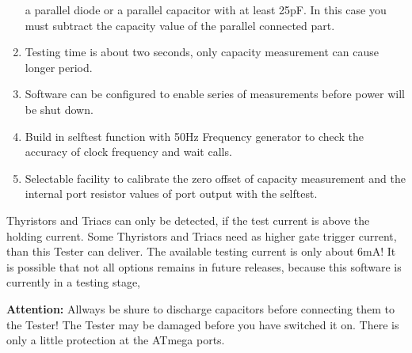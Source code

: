 \begin{enumerate}
a parallel diode or a parallel capacitor with at least 25pF.
In this case you must subtract the capacity value of the parallel connected part.
\item Testing time is about two seconds, only capacity measurement can cause longer period.
\item Software can be configured to enable series of measurements before power will be shut down.
\item Build in selftest function with 50Hz Frequency generator to check the accuracy of clock frequency and wait calls.
\item Selectable facility to calibrate the zero offset of capacity measurement and the internal port resistor values of
port output with the selftest.
\end{enumerate}

Thyristors and Triacs can only be detected, if the test current is above the holding current.
Some Thyristors and Triacs need as higher gate trigger current, than this Tester can deliver.
The available testing current is only about 6mA!
It is possible that not all options remains in future releases, because this software is currently in a testing stage,

\vspace{1cm}
\textbf{{\Large Attention:}} Allways be shure to discharge capacitors before connecting them to the Tester!
The Tester may be damaged before you have switched it on. There is only a little protection at the ATmega ports.


